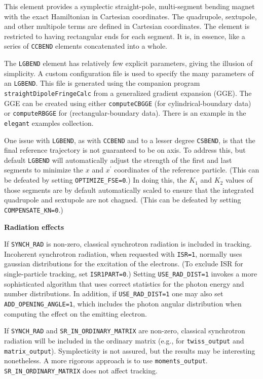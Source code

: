 This element provides a symplectic straight-pole, multi-segment bending magnet with the exact
Hamiltonian in Cartesian coordinates.
The quadrupole, sextupole, and other multipole terms are defined in Cartesian coordinates.
The element is restricted to having rectangular ends for each segment.
It is, in essence, like a series of \verb|CCBEND| \cite{Borland-LS356} elements concatenated into a whole.

The \verb|LGBEND| element has relatively few explicit parameters, giving the illusion of simplicity.
A custom configuration file is used to specify the many parameters of an \verb|LGBEND|.
This file is generated using the companion program \verb|straightDipoleFringeCalc| from 
a generalized gradient expansion (GGE). The  GGE can be
created using either \verb|computeCBGGE| (for cylindrical-boundary data) or \verb|computeRBGGE|
for (rectangular-boundary data). There is an example in the {\tt elegant} examples collection.

One issue with \verb|LGBEND|, as with \verb|CCBEND| and to a lesser degree \verb|CSBEND|, is that 
the final reference trajectory is not guaranteed to be on axis.
To address this, but default \verb|LGBEND| will automatically adjust the strength of the
first and last segments to minimize the $x$ and $x^\prime$ coordinates of the reference particle.
(This can be defeated by setting \verb|OPTIMIZE_FSE=0|.)
In doing this, the $K_1$ and $K_2$ values of those segments are by default automatically scaled
to ensure that the integrated quadrupole and sextupole are not chagned. 
(This can be defeated by setting \verb|COMPENSATE_KN=0|.)

{\bf Radiation effects}

If \verb|SYNCH_RAD| is non-zero, classical synchrotron radiation is included in tracking.
Incoherent synchrotron radiation, when requested with {\tt ISR=1},
normally uses gaussian distributions for the excitation of the electrons.
(To exclude ISR for single-particle tracking, set \verb|ISR1PART=0|.)
Setting {\tt USE\_RAD\_DIST=1} invokes a more sophisticated algorithm that
uses correct statistics for the photon energy and number distributions.
In addition, if {\tt USE\_RAD\_DIST=1} one may also set {\tt ADD\_OPENING\_ANGLE=1},
which includes the photon angular distribution when computing the effect on 
the emitting electron.  

If \verb|SYNCH_RAD| and \verb|SR_IN_ORDINARY_MATRIX| are non-zero, classical synchrotron radiation will be included in
the ordinary matrix (e.g., for \verb|twiss_output| and \verb|matrix_output|).  Symplecticity is not assured, but the results may
be interesting nonetheless. A more rigorous approach is to use \verb|moments_output|.
\verb|SR_IN_ORDINARY_MATRIX| does not affect tracking.

